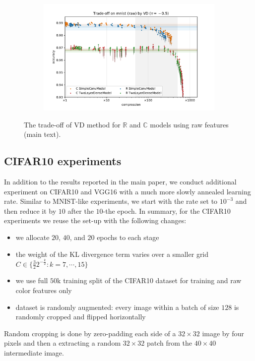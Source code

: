 \documentclass[a4paper,10pt]{article}
\newcommand{\real}{\mathbb{R}}
\newcommand{\cplx}{\mathbb{C}}
\begin{document}
\begin{figure}[b]
\begin{subfigure}[b]{0.5\textwidth}
  \end{subfigure}%
  \begin{subfigure}[b]{0.5\textwidth}
    \centering
    \includegraphics[width=\linewidth]{figure__mnist-like__trade-off/legacy__VD__mnist__raw__-0.5.pdf}
  \end{subfigure}
  \caption{%
    The trade-off of VD method for $\real$ and $\cplx$ models using raw features (main text).
  }
  \label{fig:paper__mnist-like__trade-off__VD__raw}
\end{figure}


\clearpage

\subsection{CIFAR10 experiments} %
\label{sub:cifar_experiments}

In addition to the results reported in the main paper, we conduct additional experiment
on CIFAR10 and VGG16 with a much more slowly annealed learning rate. Similar to MNIST-like
experiments, we start with the rate set to $10^{-3}$ and then reduce it by $10$ after the
$10$-the epoch. In summary, for the CIFAR10 experiments we reuse the set-up with the following
changes:
\begin{itemize}
  \item we allocate $20$, $40$, and $20$ epochs to each stage
  \item the weight of the KL divergence term varies over a smaller grid $
    C \in \{
      \tfrac32 2^{-\tfrac{k}2} \colon k=7, \cdots, 15
    \}
  $
  \item we use full $50$k training split of the CIFAR10 dataset for training and raw color
  features only
  \item dataset is randomly augmented: every image within a batch of size $128$ is randomly
  cropped and flipped horizontally
\end{itemize}
Random cropping is done by zero-padding each side of a $32\times 32$ image by four pixels
and then a extracting a random $32\times 32$ patch from the $40\times 40$ intermediate image.
\end{document}
